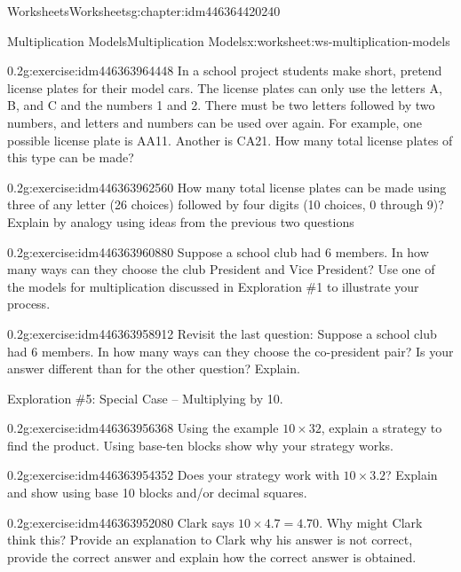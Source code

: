 \documentclass[twoside,11pt,]{book}
\begin{document}
\begin{chapterptx}{Worksheets}{}{Worksheets}{}{}{g:chapter:idm446364420240}
\begin{worksheet-section-numberless}{Multiplication Models}{}{Multiplication Models}{}{}{x:worksheet:ws-multiplication-models}
\clearpage
\begin{divisionexercise}{12}{}{0.2}{g:exercise:idm446363964448}%
In a school project students make short, pretend license plates for their model cars.  The license plates can only use the letters A, B, and C and the numbers 1 and 2.  There must be two letters followed by two numbers, and letters and numbers can be used over again.  For example, one possible license plate is AA11. Another is CA21. How many total license plates of this type can be made?%
\end{divisionexercise}%
\begin{divisionexercise}{13}{}{0.2}{g:exercise:idm446363962560}%
How many total license plates can be made using three of any letter (26 choices) followed by four digits (10 choices, 0 through 9)?  Explain by analogy using ideas from the previous two questions%
\end{divisionexercise}%
\begin{divisionexercise}{14}{}{0.2}{g:exercise:idm446363960880}%
Suppose a school club had 6 members. In how many ways can they choose the club President and Vice President? Use one of the models for multiplication discussed in Exploration \#1 to illustrate your process.%
\end{divisionexercise}%
\clearpage
\begin{divisionexercise}{15}{}{0.2}{g:exercise:idm446363958912}%
Revisit the last question: Suppose a school club had 6 members. In how many ways can they choose the co-president pair? Is your answer different than for the other question?  Explain.%
\end{divisionexercise}%
\begin{introduction}{}%
Exploration \#5: Special Case – Multiplying by 10.\end{introduction}%
\begin{divisionexercise}{16}{}{0.2}{g:exercise:idm446363956368}%
Using the example \(10 \times 32 \), explain a strategy to find the product. Using base-ten blocks show why your strategy works.%
\end{divisionexercise}%
\begin{divisionexercise}{17}{}{0.2}{g:exercise:idm446363954352}%
Does your strategy work with \(10 \times 3.2 \)? Explain and show using base 10 blocks and\slash{}or decimal squares.%
\end{divisionexercise}%
\clearpage
\begin{divisionexercise}{18}{}{0.2}{g:exercise:idm446363952080}%
Clark says \(10 \times 4.7=4.70 \). Why might Clark think this? Provide an explanation to Clark why his answer is not correct, provide the correct answer and explain how the correct answer is obtained.%

\end{divisionexercise}
\end{worksheet-section-numberless}
\end{chapterptx}
\end{document}
